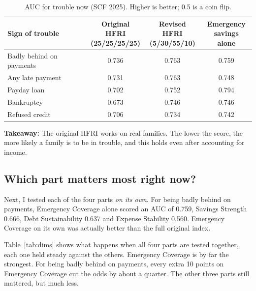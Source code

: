 \documentclass[11pt,a4paper]{article}
\newcommand{\takeaway}[1]{\par\smallskip\noindent\textbf{Takeaway:} #1\par\smallskip}
\begin{document}
\begin{table}[H]
\centering\small
\caption{AUC for trouble now (SCF 2025). Higher is better; 0.5 is a coin flip.}
\label{tab:aucnow}
\begin{tabular}{lccc}
\toprule
Sign of trouble & \shortstack{Original HFRI\\(25/25/25/25)} & \shortstack{Revised HFRI\\(5/30/55/10)} & \shortstack{Emergency\\savings alone}\\
\midrule
Badly behind on payments & 0.736 & 0.763 & 0.759\\
Any late payment & 0.731 & 0.763 & 0.748\\
Payday loan & 0.702 & 0.752 & 0.794\\
Bankruptcy & 0.673 & 0.746 & 0.746\\
Refused credit & 0.706 & 0.734 & 0.742\\
\bottomrule
\end{tabular}
\end{table}

\takeaway{The original HFRI works on real families. The lower the score, the more likely a family is to be in trouble,
and this holds even after accounting for income.}

\subsection{Which part matters most right now?}
Next, I tested each of the four parts \emph{on its own}. For being badly behind on payments, Emergency Coverage alone
scored an AUC of 0.759, Savings Strength 0.666, Debt Sustainability 0.637 and Expense Stability 0.560. Emergency
Coverage on its own was actually better than the full original index.

Table~\ref{tab:dims} shows what happens when all four parts are tested together, each one held steady against the
others. Emergency Coverage is by far the strongest. For being badly behind on payments, every extra 10 points on
Emergency Coverage cut the odds by about a quarter. The other three parts still mattered, but much less.
\end{document}
